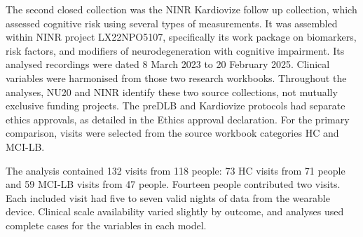 \documentclass[referee,pdflatex,sn-vancouver-num]{sn-jnl}
\begin{document}
The second closed collection was the NINR Kardiovize follow up collection,
which assessed cognitive risk using several types of measurements. It was assembled
within NINR project LX22NPO5107, specifically its work package on biomarkers, risk factors, and
modifiers of neurodegeneration with cognitive impairment. Its analysed recordings were dated 8 March 2023
to 20 February 2025. 
Clinical variables were
harmonised from those two research workbooks. Throughout the analyses, NU20
and NINR identify these two source collections, not mutually exclusive funding
projects. The preDLB and Kardiovize protocols had separate ethics approvals,
as detailed in the Ethics approval declaration.
For the primary comparison, visits were selected from the source workbook
categories HC and MCI-LB.


The analysis contained 132 visits from 118 people: 73 HC visits from 71 people
and 59 MCI-LB visits from 47 people. Fourteen people contributed two visits.
Each included visit had five to seven valid nights of data from the wearable device.
Clinical scale availability varied slightly by outcome, and analyses used
complete cases for the variables in each model.
\end{document}
